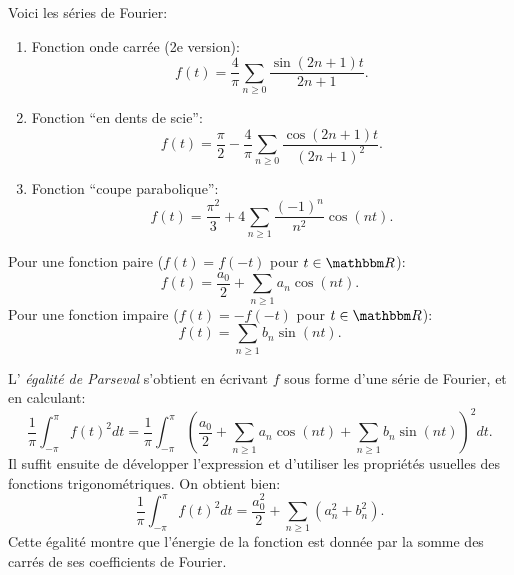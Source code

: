 \medskip

\begin{exercice}

Voici les séries de Fourier:

\begin{enumerate}
 \item Fonction onde carrée (2e version):
 \[
  f(t) = \frac4{\pi} \sum_{n\geq0} \frac{\sin (2n+1)t}{2n+1}.
 \]
 \item Fonction ``en dents de scie'':
 \[
  f(t) = \frac{\pi}2 - \frac4{\pi} \sum_{n\geq0} \frac{\cos (2n+1)t}{(2n+1)^2}.
 \]
 \item Fonction ``coupe parabolique'':
 \[
  f(t) = \frac{\pi^2}3 + 4 \sum_{n\geq1} \frac{(-1)^n}{n^2} \cos(nt).
 \]
 
\end{enumerate}

\end{exercice}

\medskip

\begin{exercice}

Pour une fonction paire ($f(t) = f(-t)$ pour $t\in\eR$):
\[
 f(t) = \frac{a_0}{2} + \sum_{n \geq 1} a_n \cos(n t).
\]
Pour une fonction impaire ($f(t) = -f(-t)$ pour $t\in\eR$):
\[
 f(t) = \sum_{n \geq 1} b_n \sin(n t).
\]
 
\end{exercice}

\medskip

\begin{exercice}

L' \emph{égalité de Parseval} s'obtient en écrivant $f$ sous forme d'une série de Fourier, et en calculant:
\[
 \frac1\pi \int_{-\pi}^{\pi} f(t)^2 dt 
 = \frac1\pi \int_{-\pi}^{\pi} \left ( \frac{a_0}{2} + \sum_{n \geq 1} a_n \cos(n t) + \sum_{n \geq 1} b_n \sin(n t) \right)^2 dt.
\]
Il suffit ensuite de développer l'expression et d'utiliser les propriétés usuelles des fonctions trigonométriques.
On obtient bien:
\[
 \frac1\pi \int_{-\pi}^{\pi} f(t)^2 dt 
 = \frac{a_0^2}2 + \sum_{n\geq1} ( a_n^2 + b_n^2).
\]
Cette égalité montre que l'énergie de la fonction est donnée par la somme des carrés de ses coefficients de Fourier.

\end{exercice}

\medskip

